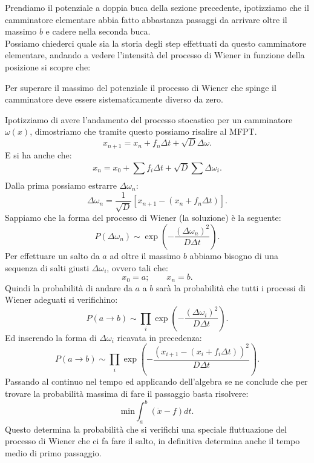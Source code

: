 Prendiamo il potenziale a doppia buca della sezione precedente, ipotizziamo che il camminatore elementare abbia fatto abbastanza passaggi da arrivare oltre il massimo $b$ e cadere nella seconda buca. \\
Possiamo chiederci quale sia la storia degli step effettuati da questo camminatore elementare, andando a vedere l'intensità del processo di Wiener in funzione della posizione si scopre che:
\begin{redbox}{}
Per superare il massimo del potenziale il processo di Wiener che spinge il camminatore deve essere sistematicamente diverso da zero.
\end{redbox}
\noindent
Ipotizziamo di avere l'andamento del processo stocastico per un camminatore $\omega (x) $, dimostriamo che tramite questo possiamo risalire al MFPT. 
\[
    x_{n+1} = x_n + f_n\Delta t + \sqrt{D}\Delta\omega
.\] 
E si ha anche che:
\[
    x_n = x_0 + \sum_{}^{} f_i \Delta t + \sqrt{D} \sum_{}^{} \Delta\omega_i
.\] 
Dalla prima possiamo estrarre $\Delta\omega_n$:
\[
    \Delta\omega_n = \frac{1}{\sqrt{D} }\left[x_{n+1}- \left(x_n + f_n \Delta t\right)\right]
.\] 
Sappiamo che la forma del processo di Wiener (la soluzione) è la seguente:
\[
P(\Delta\omega_n) \sim \exp\left(-\frac{\left(\Delta\omega_n\right)^2}{D\Delta t}\right)
.\] 
Per effettuare un salto da $a$ ad oltre il massimo $b$ abbiamo bisogno di una sequenza di salti giusti $\Delta\omega_i$, ovvero tali che:
\[
    x_0=a; \qquad x_n = b
.\] 
Quindi la probabilità di andare da $a$  a $b$ sarà la probabilità che tutti i processi di Wiener adeguati si verifichino:
\[
    P(a\to b) \sim \prod_{i}^{} \exp\left(-\frac{\left(\Delta\omega_i\right)^2}{D\Delta t}\right) 
.\] 
Ed inserendo la forma di $\Delta\omega_i$ ricavata in precedenza:
\[
    P(a\to b) \sim \prod_{i}^{} \exp\left(-\frac{\left( x_{i+1}-(x_i + f_i\Delta t) \right)^2}{D\Delta t}\right) 
.\] 
Passando al continuo nel tempo ed applicando dell'algebra se ne conclude che per trovare la probabilità massima di fare il passaggio basta risolvere:
\[
    \text{min}\int_{a}^{b} \left(\dot{x}-f\right) dt
.\] 
Questo determina la probabilità che si verifichi una speciale fluttuazione del processo di Wiener che ci fa fare il salto, in definitiva determina anche il tempo medio di primo passaggio.
\clearpage
